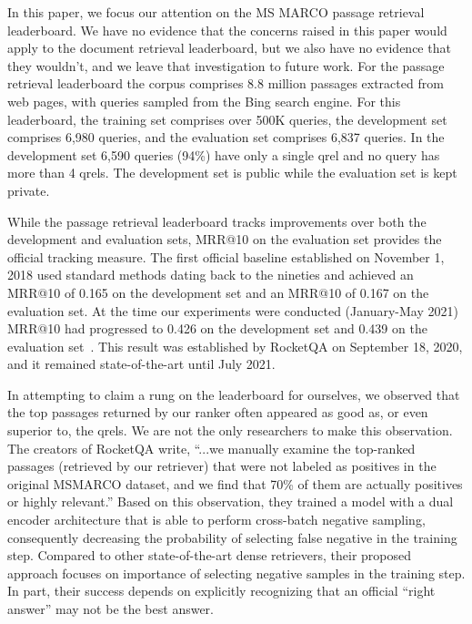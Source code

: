 \documentclass[fullpage]{article}
\begin{document}
In this paper, we focus our attention on the MS MARCO passage retrieval leaderboard. We have no evidence that the concerns raised in this paper would apply to the document retrieval leaderboard, but we also have no evidence that they wouldn't, and we leave that investigation to future work. For the passage retrieval leaderboard the corpus comprises 8.8 million passages extracted from web pages, with queries sampled from the Bing search engine. For this leaderboard, the training set comprises over 500K queries, the development set comprises 6,980 queries, and the evaluation set comprises 6,837 queries. In the development set 6,590 queries (94\%) have only a single qrel and no query has more than 4 qrels. The development set is public while the evaluation set is kept private.

While the passage retrieval leaderboard tracks improvements over both the development and evaluation sets, MRR@10 on the evaluation set provides the official tracking measure.
The first official baseline established on November 1, 2018 used standard methods dating back to the nineties and achieved an MRR@10 of 0.165 on the development set and an MRR@10 of 0.167 on the evaluation set. At the time our experiments were conducted (January-May 2021) MRR@10 had progressed to 0.426 on the development set and 0.439 on the evaluation set~\cite{ding2020rocketqa}. This result was established by RocketQA on September 18, 2020, and it remained state-of-the-art until July 2021.

In attempting to claim a rung on the leaderboard for ourselves, we observed that the top passages returned by our ranker often appeared as good as, or even superior to, the qrels. We are not the only researchers to make this observation. The creators of RocketQA write, ``...we manually examine the top-ranked passages (retrieved by our retriever) that were not labeled as positives in the original MSMARCO dataset, and we find that 70\% of them are actually positives or highly relevant.'' Based on this observation, they trained a model with a dual encoder architecture that is able to perform cross-batch negative sampling, consequently decreasing the probability of selecting false negative in the training step. Compared to other state-of-the-art dense retrievers, their proposed approach focuses on importance of selecting negative samples in the training step. In part, their success depends on explicitly recognizing that an official ``right answer'' may not be the best answer.
\end{document}
